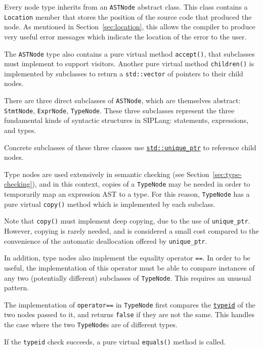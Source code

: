 \documentclass[11pt,a4paper]{scrartcl}
\begin{document}
Every node type inherits from an \verb!ASTNode! abstract class. This class contains a \verb!Location! member that stores the position of the source code that produced the node. As mentioned in Section~\ref{sec:location}, this allows the compiler to produce very useful error messages which indicate the location of the error to the user.

The \verb!ASTNode! type also contains a pure virtual method \verb!accept()!, that subclasses must implement to support visitors. Another pure virtual method \verb!children()! is implemented by subclasses to return a \verb|std::vector| of pointers to their child nodes.

There are three direct subclasses of \verb!ASTNode!, which are themselves abstract: \verb!StmtNode!, \verb!ExprNode!, \verb!TypeNode!. These three subclasses represent the three fundamental kinds of syntactic structures in SIPLang: statements, expressions, and types.

Concrete subclasses of these three classes use \href{https://en.cppreference.com/w/cpp/memory/unique_ptr}{\Verb!std::unique_ptr!} to reference child nodes.

Type nodes are used extensively in semantic checking (see Section~\ref{sec:type-checking}), and in this context, copies of a \verb|TypeNode| may be needed in order to temporarily map an expression AST to a type. For this reason, \verb|TypeNode| has a pure virtual \verb|copy()| method which is implemented by each subclass.

Note that \verb|copy()| must implement deep copying, due to the use of \verb!unique_ptr!. However, copying is rarely needed, and is considered a small cost compared to the convenience of the automatic deallocation offered by \verb!unique_ptr!.

In addition, type nodes also implement the equality operator \verb!==!. In order to be useful, the implementation of this operator must be able to compare instances of any two (potentially different) subclasses of \verb|TypeNode|. This requires an unusual pattern.

The implementation of \verb!operator==! in \verb!TypeNode! first compares the \href{https://en.cppreference.com/w/cpp/language/typeid}{\Verb!typeid!} of the two nodes passed to it, and returns \verb!false! if they are not the same. This handles the case where the two \verb!TypeNode!s are of different types.

If the \verb|typeid| check succeeds, a pure virtual \verb!equals()! method is called.
\end{document}
